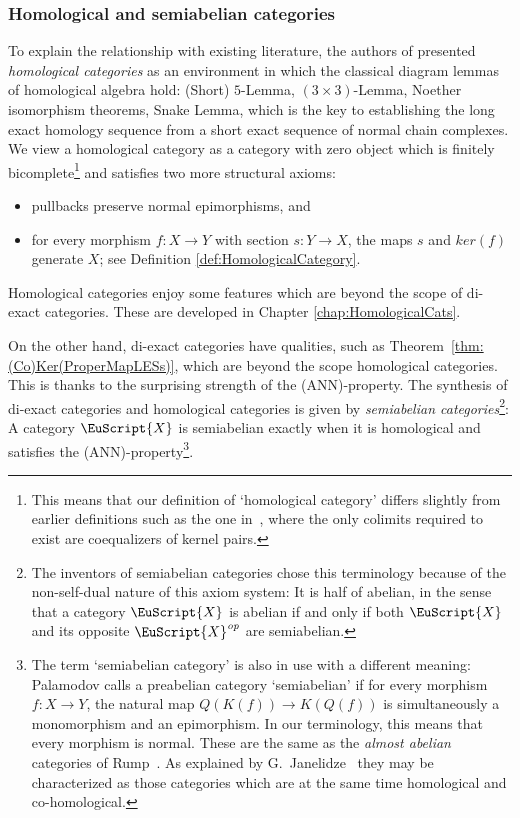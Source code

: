 \documentclass [12pt,oneside]{book}%
\theoremstyle{captionstyle}  %
\newenvironment{ulist}{			%
	\begin{itemize}}{
	\end{itemize}
}
\newcommand{\from}{\colon}				%
\newcommand{\op}{\ensuremath{\mathit{op}}}
\newcommand{\Ctgry}[1]{\EuScript{#1}}					%
\newcommand{\Prdct}[2]{#1 \times #2}	 	%
\newcommand{\Ker}[1]{\textit{K}(#1)}		     	%
\newcommand{\KerMap}[1]{\textit{ker}(#1)}		     	%
\newcommand{\CoKer}[1]{\textit{Q}(#1)}               %
\newcommand{\ANNInline}{(ANN)}																%
\begin{document}
\subsubsection*{Homological and semiabelian categories}
To explain the relationship with existing literature, the authors of \cite{FBorceuxDBourn2004} presented \emph{homological categories} as an environment in which the classical diagram lemmas of homological algebra hold: (Short) $5$-Lemma, $(\Prdct{3}{3})$-Lemma, Noether isomorphism theorems, Snake Lemma, which is the key to establishing the long exact homology sequence from a short exact sequence of normal chain complexes. We view a homological category as a category with zero object which is finitely bicomplete\footnote{
    This means that our definition of `homological category' differs slightly from earlier definitions such as the one in~\cite{BB}, where the only colimits required to exist are coequalizers of kernel pairs.} and satisfies two more structural axioms:
\begin{ulist}
    \item pullbacks preserve normal epimorphisms, and
    \item for every morphism $f\from X\to Y$ with section $s\from Y\to X$, the maps $s$ and $\KerMap{f}$ generate $X$; see Definition \ref{def:HomologicalCategory}.
\end{ulist}
Homological categories enjoy some features which are beyond the scope of di-exact categories. These are developed in Chapter \ref{chap:HomologicalCats}.


On the other hand, di-exact categories have qualities, such as Theorem~\ref{thm:(Co)Ker(ProperMapLESs)}, which are beyond the scope homological categories. This is thanks to the surprising strength of the \ANNInline-property. The synthesis of di-exact categories and homological categories is given by \emph{semiabelian categories}\footnote{The inventors of semiabelian categories chose this terminology because of the non-self-dual nature of this axiom system: It is half of abelian, in the sense that a category $\Ctgry{X}$ is abelian if and only if  both $\Ctgry{X}$ and its opposite $\Ctgry{X}^{\op}$ are semiabelian.}: A category $\Ctgry{X}$ is semiabelian exactly when it is homological and satisfies the \ANNInline-property\footnote{The term `semiabelian category' is also in use with a different meaning: Palamodov \cite{VPPalamodov1968,VPPalamodov1971} calls a preabelian category `semiabelian' if for every morphism  $f\from X\to Y$, the natural map $\CoKer{\Ker{f}} \longrightarrow \Ker{\CoKer{f}}$ is simultaneously a monomorphism and an epimorphism. In our terminology, this means that every morphism is normal. These are the same as the \emph{almost abelian} categories of Rump~\cite{Rump0}. As explained by G.~Janelidze~\cite{MR2369170} they may be characterized as those categories which are at the same time homological and co-homological.}.
\end{document}
